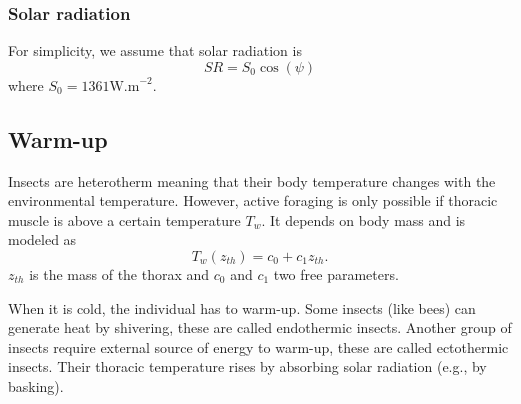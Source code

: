 \subsubsection*{Solar radiation}
For simplicity, we assume that solar radiation is \[SR = S_0 \cos(\psi) \] where $S_0 = 1361 \mbox{W.m}^{-2}$. 
 
\subsection*{Warm-up}
Insects are heterotherm meaning that their body temperature changes with the environmental temperature. 
However, active foraging is only possible if thoracic muscle is above a certain temperature $T_w$.
It depends on body mass and is  modeled as 
\begin{equation} \label{eq:Tw}
	T_w(z_{th}) = c_0+ c_1 z_{th}.
\end{equation}
$z_{th}$ is the mass of the thorax and $c_0$ and $c_1$ two free parameters.

When it is cold, the individual has to warm-up.
Some insects (like bees) can generate heat by shivering, these are called endothermic insects.
Another group of insects require external source of energy to warm-up, these are called ectothermic insects.
Their thoracic temperature rises by absorbing solar radiation (e.g., by basking). 
  
